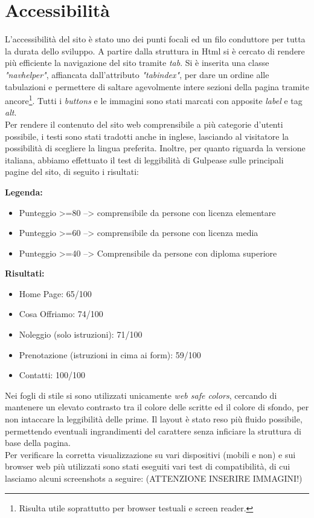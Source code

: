 \section{Accessibilità}
\label{sec:access}
L'accessibilità del sito è stato uno dei punti focali ed un filo conduttore per tutta la durata dello sviluppo. A partire dalla struttura in Html si è cercato di rendere più efficiente la navigazione del sito tramite \emph{tab}. Si è inserita una classe \emph{"navhelper"}, affiancata dall'attributo \emph{"tabindex"}, per dare un ordine alle tabulazioni e permettere di saltare agevolmente intere sezioni della pagina tramite ancore\footnote{Risulta utile soprattutto per browser testuali e screen reader.}. 
Tutti i \emph{buttons} e le immagini sono stati marcati con apposite \emph{label} e tag \emph{alt}.\\
Per rendere il contenuto del sito web comprensibile a più categorie d'utenti possibile, i testi sono stati tradotti anche in inglese, lasciando al visitatore la possibilità di scegliere la lingua preferita. Inoltre, per quanto riguarda la versione italiana, abbiamo effettuato il test di leggibilità di Gulpease sulle principali pagine del sito, di seguito i risultati: \\

\begin{framed}
\begin{center}
\textbf{Legenda:} 
\begin{itemize}
\item Punteggio >=80 --> comprensibile da persone con licenza elementare
\item Punteggio >=60 --> comprensibile da persone con licenza media
\item Punteggio >=40 --> Comprensibile da persone con diploma superiore
\end{itemize}
\textbf{Risultati:}
\begin{itemize}
\item Home Page: 65/100
\item Cosa Offriamo: 74/100
\item Noleggio (solo istruzioni): 71/100
\item Prenotazione (istruzioni in cima ai form): 59/100
\item Contatti: 100/100
\end{itemize}
\end{center}
\end{framed}

Nei fogli di stile si sono utilizzati unicamente \emph{web safe colors}, cercando di mantenere un elevato contrasto tra il colore delle scritte ed il colore di sfondo, per non intaccare la leggibilità delle prime. Il layout è stato reso più fluido possibile, permettendo eventuali ingrandimenti del carattere senza inficiare la struttura di base della pagina.\\
Per verificare la corretta visualizzazione su vari dispositivi (mobili e non) e sui browser web più utilizzati sono stati eseguiti vari test di compatibilità, di cui lasciamo alcuni screenshots a seguire: (ATTENZIONE INSERIRE IMMAGINI!)